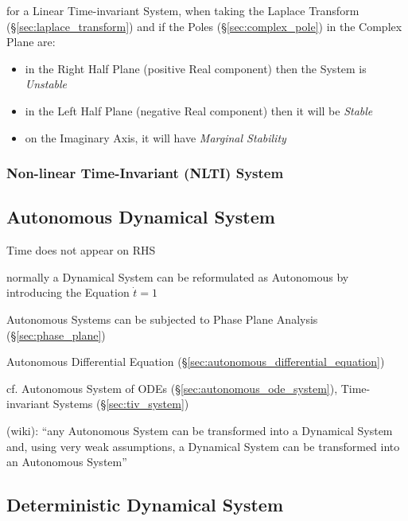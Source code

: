 for a Linear Time-invariant System, when taking the Laplace Transform
(\S\ref{sec:laplace_transform}) and if the Poles (\S\ref{sec:complex_pole}) in
the Complex Plane are:
\begin{itemize}
  \item in the Right Half Plane (positive Real component) then the System is
    \emph{Unstable}
  \item in the Left Half Plane (negative Real component) then it will be
    \emph{Stable}
  \item on the Imaginary Axis, it will have \emph{Marginal Stability}
\end{itemize}



\subsubsection{Non-linear Time-Invariant (NLTI) System}\label{sec:nlti_system}



\subsection{Autonomous Dynamical System}\label{sec:autonomous_dynamical_system}

Time does not appear on RHS

normally a Dynamical System can be reformulated as Autonomous by introducing
the Equation $\dot{t} = 1$

Autonomous Systems can be subjected to Phase Plane Analysis
(\S\ref{sec:phase_plane})

Autonomous Differential Equation (\S\ref{sec:autonomous_differential_equation})

cf. Autonomous System of ODEs (\S\ref{sec:autonomous_ode_system}),
Time-invariant Systems (\S\ref{sec:tiv_system})

(wiki): ``any Autonomous System can be transformed into a Dynamical System and,
using very weak assumptions, a Dynamical System can be transformed into an
Autonomous System''




\subsection{Deterministic Dynamical System}
\label{sec:deterministic_dynamical_system}

